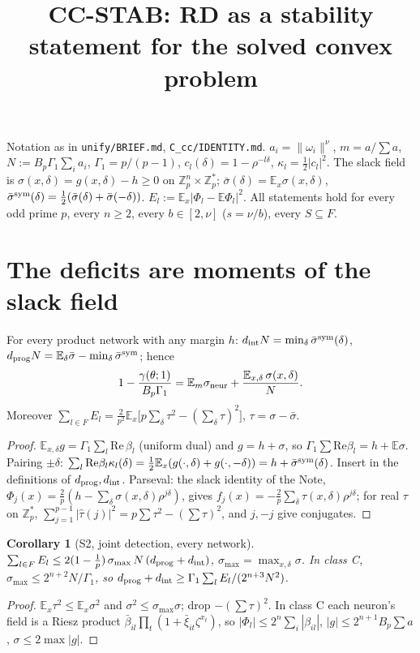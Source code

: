 \documentclass[11pt]{article}
\title{CC-STAB: RD as a stability statement for the solved convex problem}
\date{}
\newtheorem{corollary}[theorem]{Corollary}
\theoremstyle{remark}\newtheorem{remark}[theorem]{Remark}
\newcommand{\E}{\mathbb{E}}
\begin{document}
\maketitle
Notation as in \texttt{unify/BRIEF.md}, \texttt{C\_cc/IDENTITY.md}. $a_i=\|\omega_i\|^\nu$, $m=a/\sum a$,
$N:=B_p\Gamma_1\sum_i a_i$, $\Gamma_1=p/(p-1)$, $c_l(\delta)=1-\rho^{-l\delta}$, $\kappa_l=\tfrac12|c_l|^2$.
The slack field is $\sigma(x,\delta)=g(x,\delta)-h\ge 0$ on $\mathbb Z_p^n\times\mathbb Z_p^*$; $\bar\sigma(\delta)=\E_x\sigma(x,\delta)$,
$\bar\sigma^{\rm sym}(\delta)=\tfrac12(\bar\sigma(\delta)+\bar\sigma(-\delta))$. $E_l:=\E_x|\Phi_l-\E\Phi_l|^2$.
All statements hold for every odd prime $p$, every $n\ge2$, every $b\in[2,\nu]$ ($s=\nu/b$), every $S\subseteq F$.

\section{The deficits are moments of the slack field}
\begin{proposition}[S1]\label{S1} For every product network with any margin $h$:
$d_{\rm int}N=\min_\delta\bar\sigma^{\rm sym}(\delta)$, $d_{\rm prog}N=\E_\delta\bar\sigma-\min_\delta\bar\sigma^{\rm sym}$; hence
\[1-\frac{\gamma(\theta;1)}{B_p\Gamma_1}=\E_m\sigma_{\rm neur}+\frac{\E_{x,\delta}\,\sigma(x,\delta)}{N}.\]
Moreover $\sum_{l\in F}E_l=\frac{2}{p^2}\E_x\big[p\sum_\delta\tau^2-(\sum_\delta\tau)^2\big]$, $\tau=\sigma-\bar\sigma$.
\end{proposition}
\begin{proof} $\E_{x,\delta}g=\Gamma_1\sum_l\mathrm{Re}\,\beta_l$ (uniform dual) and $g=h+\sigma$, so $\Gamma_1\sum\mathrm{Re}\beta_l=h+\E\sigma$.
Pairing $\pm\delta$: $\sum_l\mathrm{Re}\beta_l\kappa_l(\delta)=\tfrac12\E_x(g(\cdot,\delta)+g(\cdot,-\delta))=h+\bar\sigma^{\rm sym}(\delta)$.
Insert in the definitions of $d_{\rm prog},d_{\rm int}$. Parseval: the slack identity of the Note,
$\Phi_j(x)=\frac2p(h-\sum_\delta\sigma(x,\delta)\rho^{j\delta})$, gives $f_j(x)=-\frac2p\sum_\delta\tau(x,\delta)\rho^{j\delta}$; for real $\tau$ on
$\mathbb Z_p^*$, $\sum_{j=1}^{p-1}|\hat\tau(j)|^2=p\sum\tau^2-(\sum\tau)^2$, and $j,-j$ give conjugates.\end{proof}

\begin{corollary}[S2, joint detection, every network]\label{S2}
$\sum_{l\in F}E_l\le 2(1-\tfrac1p)\,\sigma_{\max}\,N\,(d_{\rm prog}+d_{\rm int})$, $\sigma_{\max}=\max_{x,\delta}\sigma$.
In class C, $\sigma_{\max}\le 2^{n+2}N/\Gamma_1$, so $d_{\rm prog}+d_{\rm int}\ge \Gamma_1\sum_lE_l/(2^{n+3}N^2)$.
\end{corollary}
\begin{proof} $\E_x\tau^2\le\E_x\sigma^2$ and $\sigma^2\le\sigma_{\max}\sigma$; drop $-(\sum\tau)^2$. In class C each neuron's field is a Riesz product
$\bar\beta_{il}\prod_t(1+\bar\xi_{it}\zeta^{x_t})$, so $|\Phi_l|\le 2^n\sum_{i}|\beta_{il}|$, $|g|\le 2^{n+1}B_p\sum a$, $\sigma\le 2\max|g|$.\end{proof}
\end{document}
